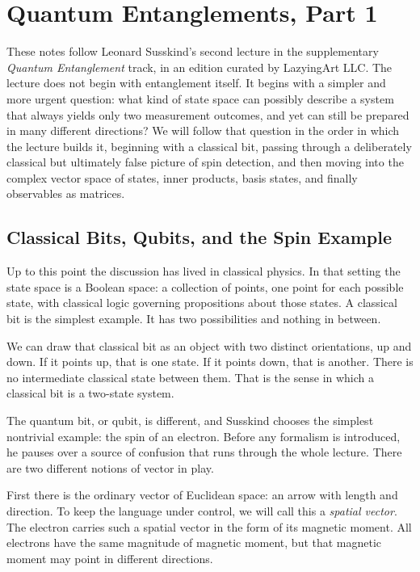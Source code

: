 \chapter{Quantum Entanglements, Part 1}

These notes follow Leonard Susskind's second lecture in the supplementary \emph{Quantum Entanglement} track, in an edition curated by LazyingArt LLC. The lecture does not begin with entanglement itself. It begins with a simpler and more urgent question: what kind of state space can possibly describe a system that always yields only two measurement outcomes, and yet can still be prepared in many different directions? We will follow that question in the order in which the lecture builds it, beginning with a classical bit, passing through a deliberately classical but ultimately false picture of spin detection, and then moving into the complex vector space of states, inner products, basis states, and finally observables as matrices.

\section{Classical Bits, Qubits, and the Spin Example}

Up to this point the discussion has lived in classical physics. In that setting the state space is a Boolean space: a collection of points, one point for each possible state, with classical logic governing propositions about those states. A classical bit is the simplest example. It has two possibilities and nothing in between.

We can draw that classical bit as an object with two distinct orientations, up and down. If it points up, that is one state. If it points down, that is another. There is no intermediate classical state between them. That is the sense in which a classical bit is a two-state system.

The quantum bit, or qubit, is different, and Susskind chooses the simplest nontrivial example: the spin of an electron. Before any formalism is introduced, he pauses over a source of confusion that runs through the whole lecture. There are two different notions of vector in play.

First there is the ordinary vector of Euclidean space: an arrow with length and direction. To keep the language under control, we will call this a \emph{spatial vector}. The electron carries such a spatial vector in the form of its magnetic moment. All electrons have the same magnitude of magnetic moment, but that magnetic moment may point in different directions.

